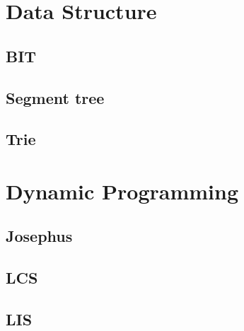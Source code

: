\section{Data Structure}
        \subsection{BIT}
                
        \subsection{Segment tree}
                
        \subsection{Trie}
                

\section{Dynamic Programming}
        \subsection{Josephus}
                
        \subsection{LCS}
                
        \subsection{LIS}
                

